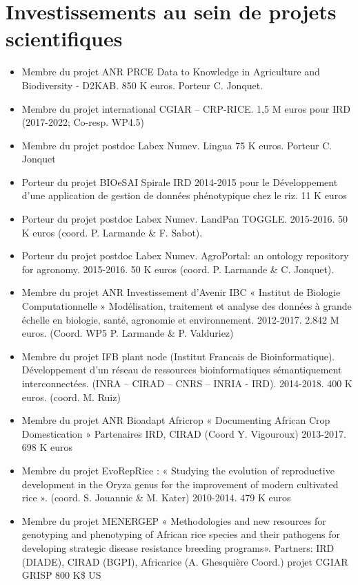 \section{Investissements au sein de projets scientifiques}
\begin{itemize}
\item Membre du projet ANR PRCE Data to Knowledge in Agriculture and Biodiversity - D2KAB. 850 K euros. Porteur C. Jonquet.
\item Membre du projet international CGIAR – CRP-RICE. 1,5 M euros pour IRD (2017-2022; Co-resp. WP4.5)
\item Membre du projet postdoc Labex Numev. Lingua 75 K euros. Porteur C. Jonquet
\item Porteur du projet BIOeSAI Spirale IRD 2014-2015 pour le Développement d’une application de gestion de données phénotypique chez le riz. 11 K euros 
\item Porteur du projet postdoc Labex Numev. LandPan TOGGLE. 2015-2016. 50 K euros (coord. P. Larmande \& F. Sabot).

\item Porteur du projet postdoc Labex Numev. AgroPortal: an ontology repository for agronomy. 2015-2016. 50 K euros (coord. P. Larmande \& C. Jonquet).

\item Membre du projet ANR Investissement d’Avenir IBC « Institut de Biologie Computationnelle » Modélisation, traitement et analyse des données à grande échelle en biologie, santé, agronomie et environnement. 2012-2017. 2.842 M euros. (Coord. WP5 P. Larmande \& P. Valduriez)

\item Membre du projet IFB plant node  (Institut Francais de Bioinformatique).  Développement d’un réseau de ressources bioinformatiques sémantiquement interconnectées. (INRA – CIRAD – CNRS – INRIA  - IRD). 2014-2018. 400 K euros.  (coord. M. Ruiz) 

\item Membre du projet ANR Bioadapt Africrop  « Documenting African Crop Domestication » Partenaires IRD, CIRAD (Coord Y. Vigouroux) 2013-2017. 698 K euros
\item Membre du projet EvoRepRice : « Studying the evolution of reproductive development in the Oryza genus for the improvement of modern cultivated rice ». (coord.  S. Jouannic \& M. Kater) 2010-2014.  479 K euros
\item Membre du projet MENERGEP « Methodologies and new resources for genotyping and phenotyping of African rice species and their pathogens for developing strategic disease resistance breeding programs». Partners: IRD (DIADE), CIRAD (BGPI), Africarice (A. Ghesquière Coord.) projet CGIAR GRISP 800 K\$ US
\end{itemize}

